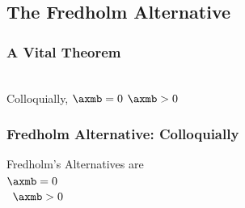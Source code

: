 \subsection{The Fredholm Alternative}
%
\begin{frame}\frametitle{A Vital Theorem}

\pause
	\ \\
Colloquially,  $\axmb = 0$  $\axmb > 0$
\end{frame}
%
%
\begin{frame}\frametitle{Fredholm Alternative: Colloquially}
Fredholm's Alternatives are \\
	 $\axmb = 0$ \\
	 \phantom{mj}\, $\axmb > 0$
\end{frame}

